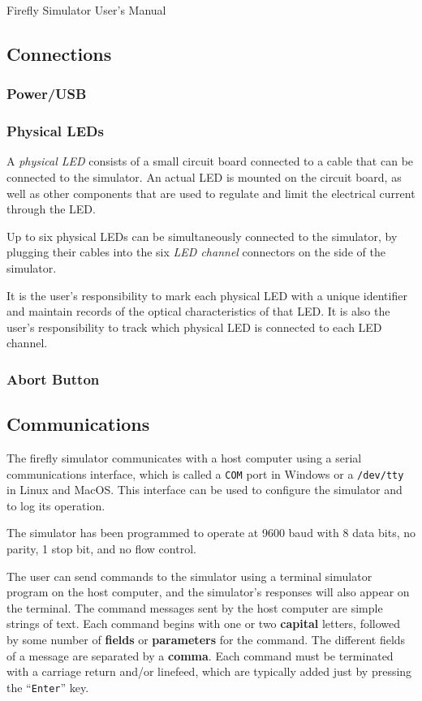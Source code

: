 \documentclass[letterpaper,11pt]{article}
\begin{document}
\Large
\centerline{Firefly Simulator User's Manual}
\normalsize
\subsection*{Connections}
\subsubsection*{Power/USB}
\subsubsection*{Physical LEDs}

A \textit{physical LED} consists of a small circuit board connected to a cable
that can be connected to the simulator. An actual LED is mounted on the circuit
board, as well as other components that are used to regulate and limit the
electrical current through the LED.

Up to six physical LEDs can be simultaneously connected to the simulator, by
plugging their cables into the six \textit{LED channel} connectors on the side
of the simulator.

It is the user's responsibility to mark each physical LED with a unique
identifier and maintain records of the optical characteristics of that LED.
It is also the user's responsibility to track which physical LED is connected
to each LED channel.

\subsubsection*{Abort Button}

\subsection*{Communications}

The firefly simulator communicates with a host computer using a serial
communications interface, which is called a \texttt{COM} port in Windows or a
\texttt{/dev/tty} in Linux and MacOS. This interface can be used to configure
the simulator and to log its operation.

The simulator has been programmed to operate at 9600 baud with 8 data bits,
no parity, 1 stop bit, and no flow control.

The user can send commands to the simulator using a terminal simulator program
on the host computer, and the simulator's responses will also appear on the
terminal. The command messages sent by the host computer are simple strings of
text. Each command begins with one or two \textbf{capital} letters, followed
by some number of \textbf{fields} or \textbf{parameters} for the command. The
different fields of a message are separated by a \textbf{comma}. Each command
must be terminated with a carriage return and/or linefeed, which are typically
added just by pressing the ``\texttt{Enter}'' key.
\end{document}
